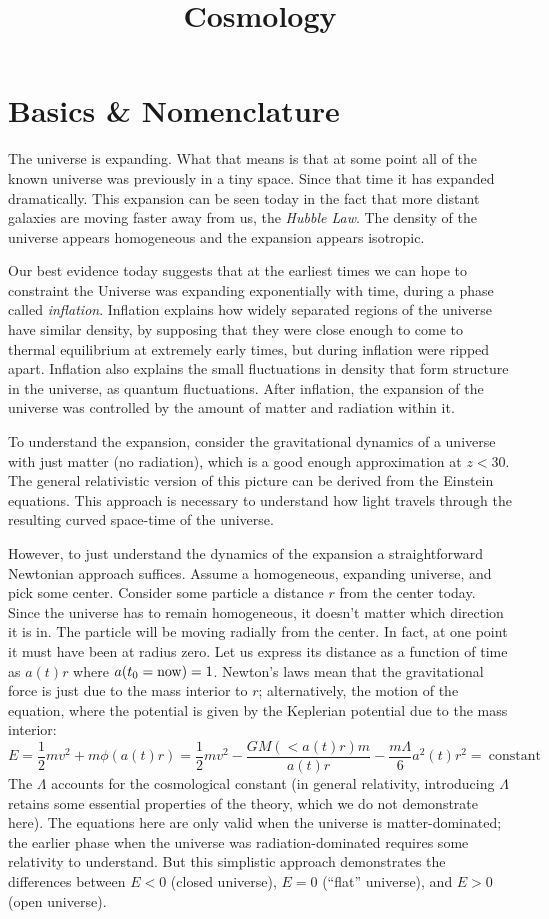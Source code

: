 \title{\bf Cosmology}

\section{Basics \& Nomenclature}

The universe is expanding. What that means is that at some point all
of the known universe was previously in a tiny space. Since that time
it has expanded dramatically. This expansion can be seen today in the
fact that more distant galaxies are moving faster away from us, the
{\it Hubble Law}. The density of the universe appears homogeneous and
the expansion appears isotropic.

Our best evidence today suggests that at the earliest times we can
hope to constraint the Universe was expanding exponentially with time,
during a phase called {\it inflation}. Inflation explains how widely
separated regions of the universe have similar density, by supposing
that they were close enough to come to thermal equilibrium at
extremely early times, but during inflation were ripped apart.
Inflation also explains the small fluctuations in density that form
structure in the universe, as quantum fluctuations. After inflation,
the expansion of the universe was controlled by the amount of matter
and radiation within it.

To understand the expansion, consider the gravitational dynamics of a
universe with just matter (no radiation), which is a good enough
approximation at $z<30$. The general relativistic version of this
picture can be derived from the Einstein equations. This approach is
necessary to understand how light travels through the resulting curved
space-time of the universe.

However, to just understand the dynamics of the expansion a
straightforward Newtonian approach suffices.  Assume a homogeneous,
expanding universe, and pick some center.  Consider some particle a
distance $r$ from the center today. Since the universe has to remain
homogeneous, it doesn't matter which direction it is in.  The particle
will be moving radially from the center. In fact, at one point it must
have been at radius zero. Let us express its distance as a function of
time as $a(t)r$ where $a(t_0 = {\rm now}) = 1$. Newton's laws mean
that the gravitational force is just due to the mass interior to $r$;
alternatively, the motion of the %
equation, where the potential is given by the Keplerian potential due
to the mass interior:
\begin{equation}
\label{eq:energy}
E = \frac{1}{2} m v^2 + m \phi(a(t) r) = \frac{1}{2} m v^2 -
\frac{GM(<a(t) r)m}{a(t) r} - \frac{m\Lambda}{6} a^2(t) r^2 =
\mathrm{~constant}
\end{equation}
The $\Lambda$ accounts for the cosmological constant (in general
relativity, introducing $\Lambda$ retains some essential properties of
the theory, which we do not demonstrate here). The equations here are
only valid when the universe is matter-dominated; the earlier phase
when the universe was radiation-dominated requires some relativity to
understand. But this simplistic approach demonstrates the differences
between $E<0$ (closed universe), $E=0$ (``flat'' universe), and $E>0$
(open universe).

